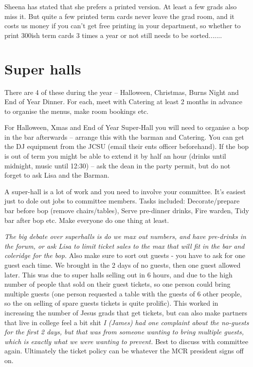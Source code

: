 \documentclass[9.5pt]{article} %
\begin{document}
Sheena has stated that she prefers a printed version. At least a few grads also miss it. But quite a few printed term cards never leave the grad room, and it costs us money if you can't get free printing in your department, so whether to print 300ish term cards 3 times a year or not still needs to be sorted.......







\section{Super halls}

There are 4 of these during the year – Halloween, Christmas, Burns Night and End of Year Dinner. For each, meet with Catering at least 2 months in advance to organise the menus, make room bookings etc.
							
For Halloween, Xmas and End of Year Super-Hall you will need to organise a bop in the bar afterwards – arrange this with the barman and Catering. You can get the DJ equipment from the JCSU (email their ents officer beforehand). If the bop is out of term you might be able to extend it by half an hour (drinks until midnight, music until 12:30) – ask the dean in the party permit, but do not forget to ask Lisa and the Barman.
					
A super-hall is a lot of work and you need to involve your committee. It's easiest just to dole out jobs to committee members. Tasks included: Decorate/prepare bar before bop (remove chairs/tables), Serve pre-dinner drinks, Fire warden, Tidy bar after bop etc. Make everyone do one thing at least.

\emph{The big debate over superhalls is do we max out numbers, and have pre-drinks in the forum, or ask Lisa to limit ticket sales to the max that will fit in the bar and coleridge for the bop.} Also make sure to sort out guests - you have to ask for one guest each time. We brought in the 2 days of no guests, then one guest allowed later. This was due to super halls selling out in 6 hours, and due to the high number of people that sold on their guest tickets, so one person could bring multiple guests (one person requested a table with the guests of 6 other people, so the on selling of spare guests tickets is quite prolific). This worked in increasing the number of Jesus grads that get tickets, but can also make partners that live in college feel a bit shit \emph{I (James) had one complaint about the no-guests for the first 2 days, but that was from someone wanting to bring multiple guests, which is exactly what we were wanting to prevent.} Best to discuss with committee again. Ultimately the ticket policy can be whatever the MCR president signs off on. 
\end{document}
